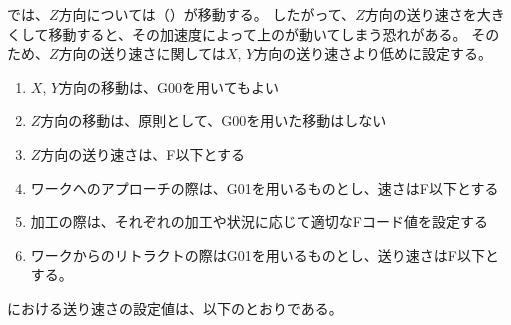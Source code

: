 \DMC では、$Z$方向については\Table（\Palette）が移動する。
したがって、$Z$方向の送り速さを大きくして移動すると、その加速度によって\Table 上の\Jig が動いてしまう恐れがある。
そのため、$Z$方向の送り速さに関しては$X$, $Y$方向の送り速さより低めに設定する。
\begin{enumerate}[label=\Roman*., ref=\Roman*]
\item $X$, $Y$方向の移動は、{\ttfamily G00}を用いてもよい
\item $Z$方向の移動は、原則として、{\ttfamily G00}を用いた移動はしない
\item {}$Z$方向の送り速さは、{\ttfamily F\SpindleRapidTraverseXY}以下とする
\item {}ワークへのアプローチの際は、{\ttfamily G01}を用いるものとし、速さは{\ttfamily F\SpindleRapidAproachFeedRateZ}以下とする
\item 加工の際は、それぞれの加工や状況に応じて適切なFコード値を設定する
\item {}ワークからのリトラクトの際は{\ttfamily G01}を用いるものとし、送り速さは{\ttfamily F\SpindleRapidTraverseXY}以下とする。
\end{enumerate}


\clearpage
\noindent
\dateKouguSpeed における送り速さの設定値は、以下のとおりである。\\

